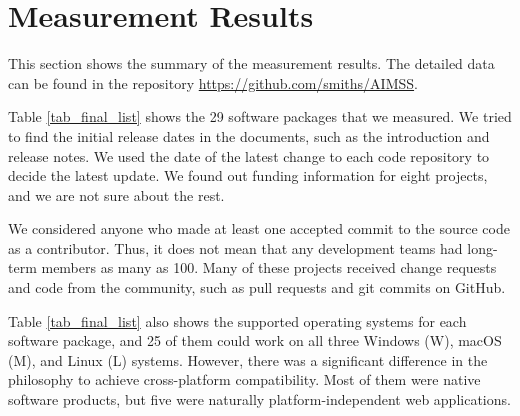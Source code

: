\chapter{Measurement Results}
\label{ch_results}

This section shows the summary of the measurement results. The detailed data can be found in the repository \hyperlink{https://github.com/smiths/AIMSS}{https://github.com/smiths/AIMSS}.

Table \ref{tab_final_list} shows the 29 software packages that we measured. We tried to find the initial release dates in the documents, such as the introduction and release notes. We used the date of the latest change to each code repository to decide the latest update. We found out funding information for eight projects, and we are not sure about the rest. 

We considered anyone who made at least one accepted commit to the source code as a contributor. Thus, it does not mean that any development teams had long-term members as many as 100. Many of these projects received change requests and code from the community, such as pull requests and git commits on GitHub.

Table \ref{tab_final_list} also shows the supported operating systems for each software package, and 25 of them could work on all three Windows (W), macOS (M), and Linux (L) systems. However, there was a significant difference in the philosophy to achieve cross-platform compatibility. Most of them were native software products, but five were naturally platform-independent web applications.

